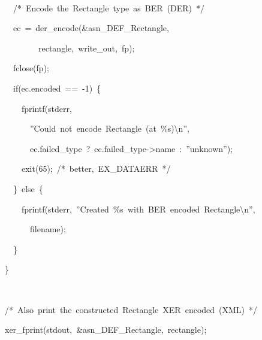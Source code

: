 \documentclass[english,oneside,12pt]{book}
\newenvironment{lyxcode}
{\par\begin{list}{}{
\setlength{\rightmargin}{\leftmargin}
\setlength{\listparindent}{0pt}%
\raggedright
\setlength{\itemsep}{0pt}
\setlength{\parsep}{0pt}
\normalfont\ttfamily}%
 \item[]}
{\end{list}}
\begin{document}
\begin{enumerate}
\begin{lyxcode}
{\small{}~~}{\small \par}

{\small{}~~~~~~/{*}~Encode~the~Rectangle~type~as~BER~(DER)~{*}/}{\small \par}

{\small{}~~~~~~ec~=~der\_encode(\&asn\_DEF\_Rectangle,}{\small \par}

{\small{}~~~~~~~~~~~~rectangle,~write\_out,~fp);}{\small \par}

{\small{}~~~~~~fclose(fp);}{\small \par}

{\small{}~~~~~~if(ec.encoded~==~-1)~\{}{\small \par}

{\small{}~~~~~~~~fprintf(stderr,}{\small \par}

{\small{}~~~~~~~~~~''Could~not~encode~Rectangle~(at~\%s)\textbackslash{}n'',}{\small \par}

{\small{}~~~~~~~~~~ec.failed\_type~?~ec.failed\_type->name~:~''unknown'');}{\small \par}

{\small{}~~~~~~~~exit(65);~/{*}~better,~EX\_DATAERR~{*}/}{\small \par}

{\small{}~~~~~~\}~else~\{}{\small \par}

{\small{}~~~~~~~~fprintf(stderr,~''Created~\%s~with~BER~encoded~Rectangle\textbackslash{}n'',}{\small \par}

{\small{}~~~~~~~~~~filename);}{\small \par}

{\small{}~~~~~~\}}{\small \par}

{\small{}~~~~\}}{\small \par}

{\small{}~}{\small \par}

{\small{}~~~~/{*}~Also~print~the~constructed~Rectangle~XER~encoded~(XML)~{*}/}{\small \par}

{\small{}~~~~xer\_fprint(stdout,~\&asn\_DEF\_Rectangle,~rectangle);}{\small \par}

{\small{}~}{\small \par}


\end{lyxcode}
\end{enumerate}
\end{document}
